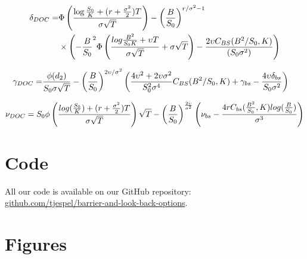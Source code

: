 \documentclass[11pt,a4paper,fleqn]{article}
\begin{document}
\begin{align*}
\delta_{DOC} =& \Phi\left({\log{S_0 \over K} + (r + {\sigma^2 \over 2})T \over \sigma\sqrt{T}}\right)- \left({B\over S_0}\right)^{r /\sigma^2 - 1}\\
&\times \left(-{B\over S_0}^2 \Phi\left({log{B^2 \over S_0K} + \upsilon T \over \sigma \sqrt{T}} + \sigma \sqrt{T}\right) - {2 \upsilon C_{BS}(B^2 / S_0, K) \over (S_0\sigma^2)}\right)
\end{align*}

\begin{align*}
\gamma_{DOC} =& {\phi(d_2) \over S_0\sigma\sqrt{T}}- \left({B \over S_0}\right)^{ 2\upsilon / \sigma^2}\left({4\upsilon^2 +2\upsilon \sigma^2\over S_0^2\sigma^4}C_{BS}(B^2 / S_0, K) + \gamma_{bs} - {4\upsilon\delta_{bs} \over S_0\sigma^2}\right)
\end{align*}

\begin{align*}
\nu_{DOC} = S_0\phi\left(\frac{log({S_0 \over K}) + (r + {\sigma^2 \over 2})T}{\sigma\sqrt{T}}\right)\sqrt{T}-\left({B \over S_0}\right)^{2\upsilon \over \sigma^2}\left(\nu_{bs} - {4rC_{bs}({B^2\over S_0}, K)log({B\over S_0}) \over \sigma^3}\right)
\end{align*}

\newpage
\section{Code}
All our code is available on our GitHub repository:\\ \url{github.com/tjespel/barrier-and-look-back-options}.

\newpage
\section{Figures}
\end{document}
